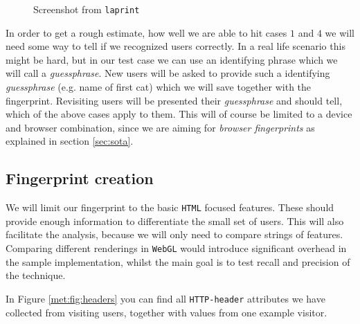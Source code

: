 \begin{figure}
\centering
{}
\caption{Screenshot from \texttt{laprint}}
\label{fig:fpscreen}
\end{figure}
In order to get a rough estimate, how well we are able to hit cases $1$ and $4$ we will need some way to tell if we recognized users correctly. In a real life scenario this might be hard, but in our test case we can use an identifying phrase which we will call a \emph{guessphrase}. New users will be asked to provide such a identifying \emph{guessphrase} (e.g. name of first cat) which we will save together with the fingerprint. Revisiting users will be presented their \emph{guessphrase} and should tell, which of the above cases apply to them. This will of course be limited to a device and browser combination, since we are aiming for \emph{browser fingerprints} as explained in section \ref{sec:sota}. 

\subsection{Fingerprint creation}
\label{subsec:fingerprintvals}

We will limit our fingerprint to the basic \texttt{HTML} focused features. These should provide enough information to differentiate the small set of users. This will also facilitate the analysis, because we will only need to compare strings of features. Comparing different renderings in \texttt{WebGL} would introduce significant overhead in the sample implementation, whilst the main goal is to test recall and precision of the technique.

In Figure \ref{met:fig:headers} you can find all \texttt{HTTP-header} attributes we have collected from visiting users, together with values from one example visitor.


